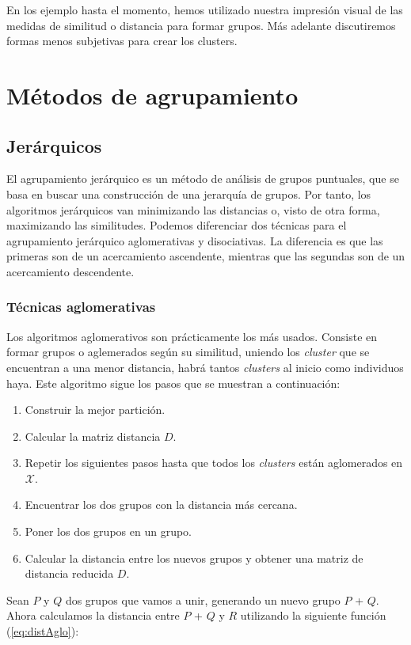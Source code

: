 \documentclass[a4paper, 20pt]{article}
\begin{document}
En los ejemplo hasta el momento, hemos utilizado nuestra impresión visual de las medidas de similitud o distancia para formar grupos. Más adelante discutiremos formas menos subjetivas para crear los clusters. 

\section{Métodos de agrupamiento}\label{sec:algoritmos}
\subsection{Jerárquicos}
El agrupamiento jerárquico es un método de análisis de grupos puntuales, que se basa en buscar una construcción de una jerarquía de grupos. Por tanto, los algoritmos jerárquicos van minimizando las distancias  o, visto de otra forma, maximizando  las similitudes. Podemos diferenciar dos técnicas para el agrupamiento jerárquico aglomerativas y disociativas. La diferencia es que las primeras son de un acercamiento ascendente, mientras que las segundas son de un acercamiento descendente.

\subsubsection{Técnicas aglomerativas}
Los algoritmos aglomerativos son prácticamente los más usados. Consiste en formar grupos o aglemerados según su similitud, uniendo los \textit{cluster} que se encuentran a una menor distancia, habrá tantos \textit{clusters} al inicio como individuos haya. Este algoritmo sigue los pasos que se muestran a continuación:

\begin{enumerate}
	\item Construir la mejor partición.
	\item Calcular la matriz distancia $D$.
	\item Repetir los siguientes pasos hasta que todos los \textit{clusters} están aglomerados en $\mathcal{X}$.
	\item Encuentrar los dos grupos con la distancia más cercana.
	\item Poner los dos grupos en un grupo.
	\item Calcular la distancia entre los nuevos grupos y obtener una matriz de distancia reducida $D$.
\end{enumerate}

Sean $P$ y $Q$ dos grupos que vamos a unir, generando un nuevo grupo $P$ + $Q$. Ahora calculamos la distancia entre $P$ + $Q$ y $R$ utilizando la siguiente función (\ref{eq:distAglo}):
\end{document}
